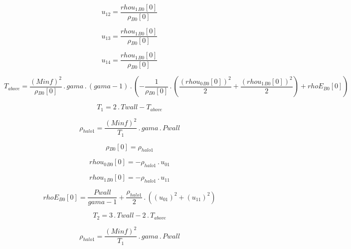 \documentclass{article}
\begin{document}
\begin{dmath}u_{12} = \frac{{rhou_{1}{_{B0}}}[{0}]}{{\rho{_{B0}}}[{0}]}\end{dmath}

\begin{dmath}u_{13} = \frac{{rhou_{1}{_{B0}}}[{0}]}{{\rho{_{B0}}}[{0}]}\end{dmath}

\begin{dmath}u_{14} = \frac{{rhou_{1}{_{B0}}}[{0}]}{{\rho{_{B0}}}[{0}]}\end{dmath}

\begin{dmath}T_{above} = \frac{\left(Minf \right)^{2}}{{\rho{_{B0}}}[{0}]} \,.\, gama \,.\, \left(gama - 1\right) \,.\, \left(- \frac{1}{{\rho{_{B0}}}[{0}]} \,.\, \left(\frac{\left({rhou_{0}{_{B0}}}[{0}] \right)^{2}}{2} + 
\frac{\left({rhou_{1}{_{B0}}}[{0}] \right)^{2}}{2}\right) + {rhoE{_{B0}}}[{0}]\right)\end{dmath}

\begin{dmath}T_{1} = 2 \,.\, Twall - T_{above}\end{dmath}

\begin{dmath}\rho_{halo 1} = \frac{\left(Minf \right)^{2}}{T_{1}} \,.\, gama \,.\, Pwall\end{dmath}

\begin{dmath}{\rho{_{B0}}}[{0}] = \rho_{halo 1}\end{dmath}

\begin{dmath}{rhou_{0}{_{B0}}}[{0}] = - \rho_{halo 1} \,.\, u_{01}\end{dmath}

\begin{dmath}{rhou_{1}{_{B0}}}[{0}] = - \rho_{halo 1} \,.\, u_{11}\end{dmath}

\begin{dmath}{rhoE{_{B0}}}[{0}] = \frac{Pwall}{gama - 1} + \frac{\rho_{halo 1}}{2} \,.\, \left(\left(u_{01} \right)^{2} + \left(u_{11} \right)^{2}\right)\end{dmath}

\begin{dmath}T_{2} = 3 \,.\, Twall - 2 \,.\, T_{above}\end{dmath}

\begin{dmath}\rho_{halo 1} = \frac{\left(Minf \right)^{2}}{T_{1}} \,.\, gama \,.\, Pwall\end{dmath}
\end{document}
